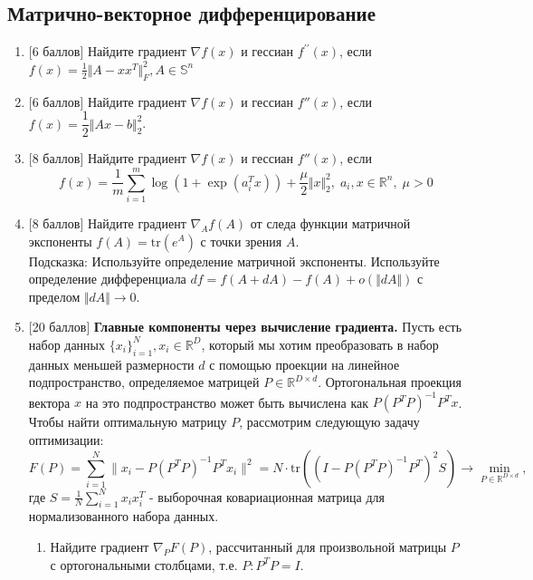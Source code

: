 \documentclass[
  russian,
  letterpaper,
  DIV=11,
  numbers=noendperiod]{scrartcl}
\begin{document}
\subsection{Матрично-векторное
дифференцирование}\label{ux43cux430ux442ux440ux438ux447ux43dux43e-ux432ux435ux43aux442ux43eux440ux43dux43eux435-ux434ux438ux444ux444ux435ux440ux435ux43dux446ux438ux440ux43eux432ux430ux43dux438ux435-1}

\begin{enumerate}
\def\labelenumi{\arabic{enumi}.}
\item
  {[}6 баллов{]} Найдите градиент \(\nabla f(x)\) и гессиан
  \(f^{\prime\prime}(x)\), если
  \(f(x) = \frac{1}{2}\Vert A - xx^T\Vert ^2_F, A \in \mathbb{S}^n\)
\item
  {[}6 баллов{]} Найдите градиент \(\nabla f(x)\) и гессиан \(f''(x)\),
  если \(f(x) = \dfrac{1}{2} \Vert Ax - b\Vert^2_2\).
\item
  {[}8 баллов{]} Найдите градиент \(\nabla f(x)\) и гессиан \(f''(x)\),
  если \[
   f(x) = \frac1m \sum\limits_{i=1}^m \log \left( 1 + \exp(a_i^{T}x) \right) + \frac{\mu}{2}\Vert x\Vert _2^2, \; a_i, x \in \mathbb R^n, \; \mu>0
   \]
\item
  {[}8 баллов{]} Найдите градиент \(\nabla_A f(A)\) от следа функции
  матричной экспоненты \(f(A) = \text{tr}(e^A)\) с точки зрения \(A\).\\
  Подсказка: Используйте определение матричной экспоненты. Используйте
  определение дифференциала
  \(df = f(A + dA) - f(A) + o(\Vert dA \Vert)\) с пределом
  \(\Vert dA \Vert \to 0\).
\item
  {[}20 баллов{]} \textbf{Главные компоненты через вычисление
  градиента.} Пусть есть набор данных
  \(\{x_i\}_{i=1}^N, x_i \in \mathbb{R}^D\), который мы хотим
  преобразовать в набор данных меньшей размерности \(d\) с помощью
  проекции на линейное подпространство, определяемое матрицей
  \(P \in \mathbb{R}^{D \times d}\). Ортогональная проекция вектора
  \(x\) на это подпространство может быть вычислена как
  \(P(P^TP)^{-1}P^Tx\). Чтобы найти оптимальную матрицу \(P\),
  рассмотрим следующую задачу оптимизации: \[
   F(P) = \sum_{i=1}^N \|x_i - P(P^TP)^{-1}P^Tx_i\|^2 = N \cdot \text{tr}\left((I - P(P^TP)^{-1}P^T)^2 S\right) \to \min_{P \in \mathbb{R}^{D \times d}},
   \] где \(S = \frac{1}{N} \sum_{i=1}^N x_i x_i^T\) - выборочная
  ковариационная матрица для нормализованного набора данных.

  \begin{enumerate}
  \def\labelenumii{\arabic{enumii}.}
  \item
    Найдите градиент \(\nabla_P F(P)\), рассчитанный для произвольной
    матрицы \(P\) с ортогональными столбцами, т.е. \(P : P^T P = I\).


\end{enumerate}
\end{enumerate}
\end{document}
